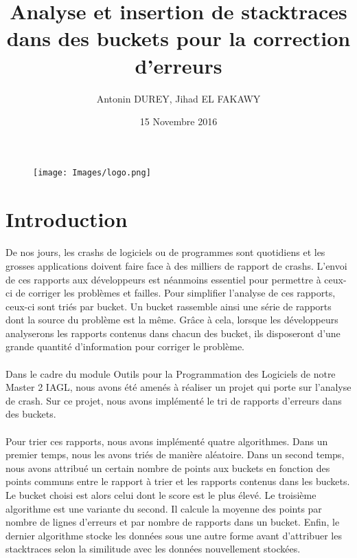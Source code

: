 \documentclass{article}
\begin{document}
\title{Analyse et insertion de stacktraces dans des buckets pour la correction d'erreurs}
\author{Antonin DUREY, Jihad EL FAKAWY}
\date{15 Novembre 2016}
\maketitle

\begin{figure}[h]
   \texttt{[image: Images/logo.png]}
\end{figure}


\newpage

\tableofcontents

\newpage
\section*{Introduction}

\paragraph{}
De nos jours, les crashs de logiciels ou de programmes sont quotidiens et les grosses applications doivent faire face à des milliers de rapport de crashs. L’envoi de ces rapports aux développeurs est néanmoins essentiel pour permettre à ceux-ci de corriger les problèmes et failles. Pour simplifier l’analyse de ces rapports, ceux-ci sont triés par bucket. Un bucket rassemble ainsi une série de rapports dont la source du problème est la même. Grâce à cela, lorsque les développeurs analyserons les rapports contenus dans chacun des bucket, ils disposeront d’une grande quantité d’information pour corriger le problème.


\paragraph{}
Dans le cadre du module Outils pour la Programmation des Logiciels de notre Master 2 IAGL, nous avons été amenés à réaliser un projet qui porte sur l’analyse de crash. Sur ce projet, nous avons implémenté le tri de rapports d’erreurs dans des buckets.
    
    
\paragraph{}
Pour trier ces rapports, nous avons implémenté quatre algorithmes. Dans un premier temps, nous les avons triés de manière aléatoire. Dans un second temps, nous avons attribué un certain nombre de points aux buckets en fonction des points communs entre le rapport à trier et les rapports contenus dans les buckets. Le bucket choisi est alors celui dont le score est le plus élevé. Le troisième algorithme est une variante du second. Il calcule la moyenne des points par nombre de lignes d’erreurs et par nombre de rapports dans un bucket. Enfin, le dernier algorithme stocke les données sous une autre forme avant d'attribuer les stacktraces selon la similitude avec les données nouvellement stockées.
\end{document}
